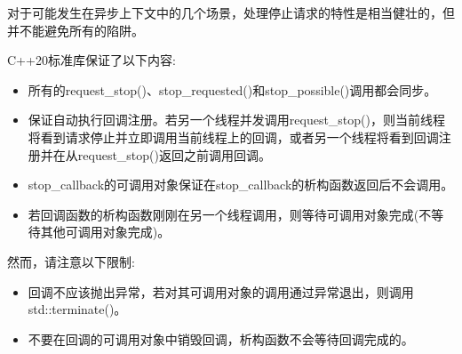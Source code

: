 
对于可能发生在异步上下文中的几个场景，处理停止请求的特性是相当健壮的，但并不能避免所有的陷阱。

C++20标准库保证了以下内容:

\begin{itemize}
\item
所有的request\_stop()、stop\_requested()和stop\_possible()调用都会同步。

\item
保证自动执行回调注册。若另一个线程并发调用request\_stop()，则当前线程将看到请求停止并立即调用当前线程上的回调，或者另一个线程将看到回调注册并在从request\_stop()返回之前调用回调。

\item
stop\_callback的可调用对象保证在stop\_callback的析构函数返回后不会调用。

\item
若回调函数的析构函数刚刚在另一个线程调用，则等待可调用对象完成(不等待其他可调用对象完成)。
\end{itemize}

然而，请注意以下限制:

\begin{itemize}
\item
回调不应该抛出异常，若对其可调用对象的调用通过异常退出，则调用std::terminate()。

\item
不要在回调的可调用对象中销毁回调，析构函数不会等待回调完成的。
\end{itemize}
